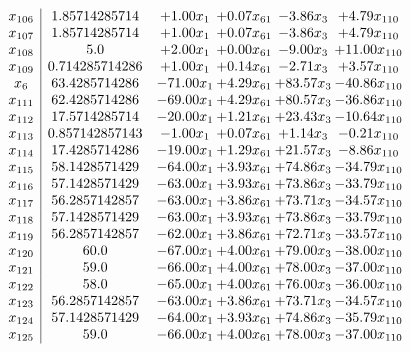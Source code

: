 \documentclass[8pt]{article}
\begin{document}
\[\begin{array}{c| c c@{\hskip 2pt} c@{\hskip 2pt} c@{\hskip 2pt} c@{\hskip 2pt} }
 x_{106}   &  1.85714285714 & +  1.00 x_{1} & +  0.07 x_{61} & -3.86 x_{3} & +  4.79 x_{110}\\
 x_{107}   &  1.85714285714 & +  1.00 x_{1} & +  0.07 x_{61} & -3.86 x_{3} & +  4.79 x_{110}\\
 x_{108}   &  5.0 & +  2.00 x_{1} & +  0.00 x_{61} & -9.00 x_{3} & + 11.00 x_{110}\\
 x_{109}   &  0.714285714286 & +  1.00 x_{1} & +  0.14 x_{61} & -2.71 x_{3} & +  3.57 x_{110}\\
 x_{6}   &  63.4285714286 & -71.00 x_{1} & +  4.29 x_{61} & + 83.57 x_{3} & -40.86 x_{110}\\
 x_{111}   &  62.4285714286 & -69.00 x_{1} & +  4.29 x_{61} & + 80.57 x_{3} & -36.86 x_{110}\\
 x_{112}   &  17.5714285714 & -20.00 x_{1} & +  1.21 x_{61} & + 23.43 x_{3} & -10.64 x_{110}\\
 x_{113}   &  0.857142857143 & -1.00 x_{1} & +  0.07 x_{61} & +  1.14 x_{3} & -0.21 x_{110}\\
 x_{114}   &  17.4285714286 & -19.00 x_{1} & +  1.29 x_{61} & + 21.57 x_{3} & -8.86 x_{110}\\
 x_{115}   &  58.1428571429 & -64.00 x_{1} & +  3.93 x_{61} & + 74.86 x_{3} & -34.79 x_{110}\\
 x_{116}   &  57.1428571429 & -63.00 x_{1} & +  3.93 x_{61} & + 73.86 x_{3} & -33.79 x_{110}\\
 x_{117}   &  56.2857142857 & -63.00 x_{1} & +  3.86 x_{61} & + 73.71 x_{3} & -34.57 x_{110}\\
 x_{118}   &  57.1428571429 & -63.00 x_{1} & +  3.93 x_{61} & + 73.86 x_{3} & -33.79 x_{110}\\
 x_{119}   &  56.2857142857 & -62.00 x_{1} & +  3.86 x_{61} & + 72.71 x_{3} & -33.57 x_{110}\\
 x_{120}   &  60.0 & -67.00 x_{1} & +  4.00 x_{61} & + 79.00 x_{3} & -38.00 x_{110}\\
 x_{121}   &  59.0 & -66.00 x_{1} & +  4.00 x_{61} & + 78.00 x_{3} & -37.00 x_{110}\\
 x_{122}   &  58.0 & -65.00 x_{1} & +  4.00 x_{61} & + 76.00 x_{3} & -36.00 x_{110}\\
 x_{123}   &  56.2857142857 & -63.00 x_{1} & +  3.86 x_{61} & + 73.71 x_{3} & -34.57 x_{110}\\
 x_{124}   &  57.1428571429 & -64.00 x_{1} & +  3.93 x_{61} & + 74.86 x_{3} & -35.79 x_{110}\\
 x_{125}   &  59.0 & -66.00 x_{1} & +  4.00 x_{61} & + 78.00 x_{3} & -37.00 x_{110}\\

\end{array}\]
\end{document}
